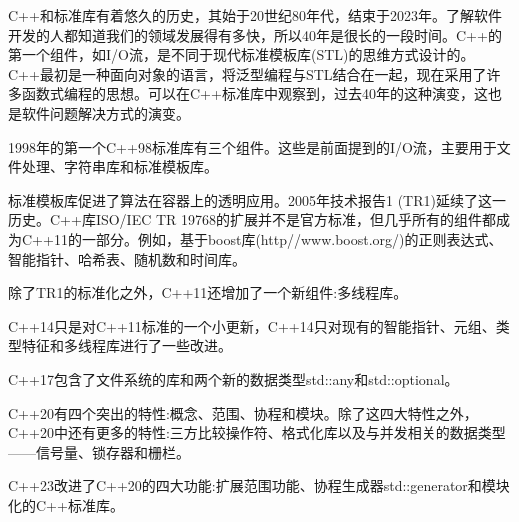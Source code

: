 C++和标准库有着悠久的历史，其始于20世纪80年代，结束于2023年。了解软件开发的人都知道我们的领域发展得有多快，所以40年是很长的一段时间。C++的第一个组件，如I/O流，是不同于现代标准模板库(STL)的思维方式设计的。C++最初是一种面向对象的语言，将泛型编程与STL结合在一起，现在采用了许多函数式编程的思想。可以在C++标准库中观察到，过去40年的这种演变，这也是软件问题解决方式的演变。


1998年的第一个C++98标准库有三个组件。这些是前面提到的I/O流，主要用于文件处理、字符串库和标准模板库。

标准模板库促进了算法在容器上的透明应用。2005年技术报告1 (TR1)延续了这一历史。C++库ISO/IEC TR 19768的扩展并不是官方标准，但几乎所有的组件都成为C++11的一部分。例如，基于boost库(http//www.boost.org/)的正则表达式、智能指针、哈希表、随机数和时间库。

除了TR1的标准化之外，C++11还增加了一个新组件:多线程库。

C++14只是对C++11标准的一个小更新，C++14只对现有的智能指针、元组、类型特征和多线程库进行了一些改进。

C++17包含了文件系统的库和两个新的数据类型std::any和std::optional。

C++20有四个突出的特性:概念、范围、协程和模块。除了这四大特性之外，C++20中还有更多的特性:三方比较操作符、格式化库以及与并发相关的数据类型——信号量、锁存器和栅栏。

C++23改进了C++20的四大功能:扩展范围功能、协程生成器std::generator和模块化的C++标准库。












